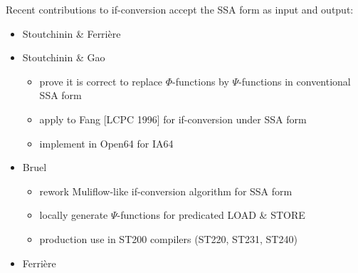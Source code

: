 Recent contributions to if-conversion accept the SSA
form as input and output: \begin{itemize}

\item Stoutchinin \& Ferri\`ere \cite{Stoutchinin:2001:MICRO}

\item Stoutchinin \& Gao \cite{Stoutchinin:2004:EuroPar}
\begin{itemize}
\item prove it is correct to replace $\Phi$-functions by $\Psi$-functions
in conventional SSA form
\item apply to Fang [LCPC 1996] for if-conversion under SSA form
\item implement in Open64 for IA64
\end{itemize}

\item Bruel \cite{Bruel:2006:ODES}
\begin{itemize}
\item rework Muliflow-like if-conversion algorithm for SSA form
\item locally generate $\Psi$-functions for predicated LOAD \& STORE
\item production use in ST200 compilers (ST220, ST231, ST240)
\end{itemize}

\item Ferri\`ere \cite{Ferriere:2007:SCOPES}

\end{itemize}





